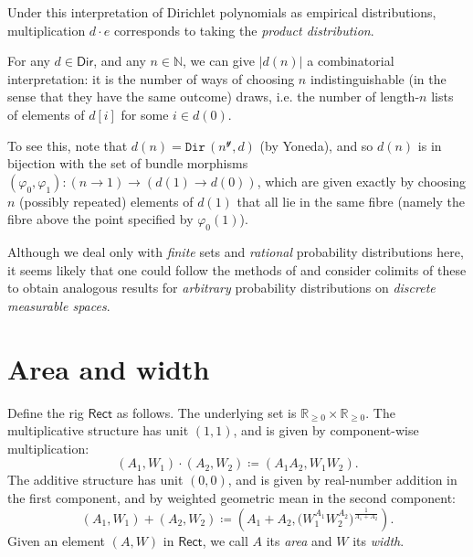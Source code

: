 \documentclass[11pt,fleqn]{article}
\renewcommand{\geq}{\geqslant}
\newcommand{\yon}{\mathcal{y}}
\newcommand{\cat}[1]{\mathtt{#1}}
\newcommand{\rig}[1]{\mathsf{#1}}
\newcommand{\Dir}{\rig{Dir}}
\newcommand{\cDir}{\cat{Dir}}
\newcommand{\Rect}{\rig{Rect}}
\begin{document}
Under this interpretation of Dirichlet polynomials as empirical distributions, multiplication $d\cdot e$ corresponds to taking the \emph{product distribution}.

\begin{remark}
  For any $d\in\Dir$, and any $n\in\mathbb{N}$, we can give $|d(n)|$ a combinatorial interpretation: it is the number of ways of choosing $n$ indistinguishable (in the sense that they have the same outcome) draws, i.e. the number of length-$n$ lists of elements of $d[i]$ for some $i\in d(0)$.

  To see this, note that $d(n)=\cDir\,(n^\yon,d)$ (by Yoneda), and so $d(n)$ is in bijection with the set of bundle morphisms $(\varphi_0,\varphi_1)\colon(n\to1)\to(d(1)\to d(0))$, which are given exactly by choosing $n$ (possibly repeated) elements of $d(1)$ that all lie in the same fibre (namely the fibre above the point specified by $\varphi_0(1)$).
\end{remark}

\begin{remark}
  Although we deal only with \emph{finite} sets and \emph{rational} probability distributions here, it seems likely that one could follow the methods of \cite{FP2019} and consider colimits of these to obtain analogous results for \emph{arbitrary} probability distributions on \emph{discrete measurable spaces}.
\end{remark}



\section{Area and width}
\label{section:area-and-width}

\begin{definition}
\label{definition:rect}
  Define the rig $\Rect$ as follows.
  The underlying set is $\mathbb{R}_{\geq0}\times\mathbb{R}_{\geq0}$.
  The multiplicative structure has unit $(1,1)$, and is given by component-wise multiplication:
  \[
    (A_1,W_1)\cdot(A_2,W_2)\coloneqq(A_1A_2,W_1W_2).
  \]
  The additive structure has unit $(0,0)$, and is given by real-number addition in the first component, and by weighted geometric mean in the second component:
  \[
    (A_1,W_1) + (A_2,W_2)
    \coloneqq \left(
      A_1 + A_2,
      \big( W_1^{A_1} W_2^{A_2} \big)^{\frac{1}{A_1+A_2}}
    \right).
  \]
  Given an element $(A,W)$ in $\Rect$, we call $A$ its \emph{area} and $W$ its \emph{width}.
\end{definition}
\end{document}
